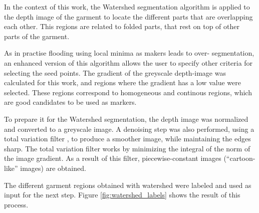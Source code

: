 In the context of this work, the Watershed segmentation algorithm is applied to the depth image of the garment to locate the different parts that are overlapping each other. This regions are related to folded parts, that rest on top of other parts of the garment. 

As in practise flooding using local minima as makers leads to over- segmentation, an enhanced version of this algorithm allows the user to specify other criteria for selecting the seed points. The gradient of the greyscale depth-image was calculated for this work, and regions where the gradient has a low value were selected. These regions correspond to homogeneous and continous regions, which are good candidates to be used as markers.

To prepare it for the Watershed segmentation, the depth image was normalized and converted to a greyscale image. A denoising step was also performed, using a total variation filter , to produce a smoother image, while maintaining the edges sharp. The total variation filter works by minimizing the integral of the norm of the image gradient. As a result of this filter, piecewise-constant images (``cartoon-like'' images) are obtained.

The different garment regions obtained with watershed were labeled and used as input for the next step. Figure \ref{fig:watershed_labels} shows the result of this process.

